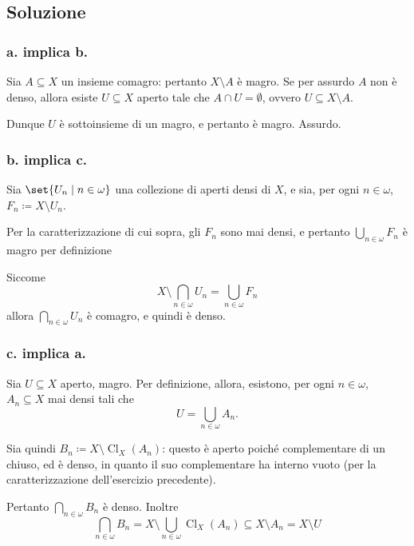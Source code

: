 \documentclass{article}
\newcommand{\1}{\mathds{1}}
\begin{document}
\subsection{Soluzione}
\label{sec:org713d1db}

\subsubsection{a. implica b.}
\label{sec:orgaba9acf}

Sia \(A \subseteq X\) un insieme comagro: pertanto \(X\setminus A\) è magro. Se per assurdo \(A\) non è denso, allora esiste \(U \subseteq X\) aperto tale che \(A\cap U = \emptyset\), ovvero \(U \subseteq X\setminus A\).

Dunque \(U\) è sottoinsieme di un magro, e pertanto è magro. Assurdo.
\subsubsection{b. implica c.}
\label{sec:orgf5e16db}

Sia \(\set{U_{n}\mid n \in \omega}\) una collezione di aperti densi di \(X\), e sia, per ogni \(n \in\omega\), \(F_{n} \coloneqq X\setminus U_{n}\).

Per la caratterizzazione di cui sopra, gli \(F_{n}\) sono mai densi, e pertanto \(\bigcup_{n \in \omega} F_{n}\) è magro per definizione

Siccome
\[
X \setminus \bigcap_{n \in \omega} U_n = \bigcup_{n \in \omega} F_n
\]
allora \(\bigcap_{n \in \omega} U_{n}\) è comagro, e quindi è denso.
\subsubsection{c. implica a.}
\label{sec:orgf3adb0d}

Sia \(U \subseteq X\) aperto, magro. Per definizione, allora, esistono, per ogni \(n \in\omega\), \(A_{n} \subseteq X\) mai densi tali che
\begin{equation*}
U = \bigcup_{n \in \omega} A_{n}.
\end{equation*}

Sia quindi \(B_{n} \coloneqq X\setminus \operatorname{Cl}_{X}(A_{n})\): questo è aperto poiché complementare di un chiuso, ed è denso, in quanto il suo complementare ha interno vuoto (per la caratterizzazione dell'esercizio precedente).

Pertanto \(\bigcap_{n \in \omega} B_{n}\) è denso. Inoltre
\begin{equation*}
\bigcap_{n \in \omega} B_{n} = X\setminus \bigcup_{n \in\omega} \operatorname{Cl}_{X}(A_{n}) \subseteq X\setminus A_{n} = X\setminus U
\end{equation*}
\end{document}
